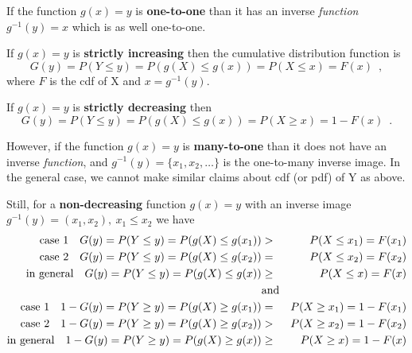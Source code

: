 If the function $g(x) = y$ is \textbf{one-to-one} than it has an inverse \emph{function} $g^{-1}(y) = x$ which is as well one-to-one.

If $g(x) = y$ is \textbf{strictly increasing} then the cumulative distribution function is
\begin{equation}
G(y) = P(Y \leq y) = P(g(X) \leq g(x)) = P(X \leq x) = F(x) \enspace ,
\end{equation}
where $F$ is the cdf of X and $x = g^{-1}(y)$.

If $g(x) = y$ is \textbf{strictly decreasing} then
\begin{equation}
G(y) = P(Y \leq y) = P(g(X) \leq g(x)) = P(X \geq x) = 1 - F(x) \enspace .
\end{equation}


However, if the function $g(x) = y$ is \textbf{many-to-one} than it does not have an inverse \emph{function}, and $g^{-1}(y) = \{ x_1, x_2, \ldots \}$ is the one-to-many inverse image. In the general case, we cannot make similar claims about cdf (or pdf) of Y as above.

Still, for a \textbf{non-decreasing} function $g(x) = y$ with an inverse image $g^{-1}(y) = (x_1, x_2), \ x_1 \leq x_2$ we have
\begin{eqnarray}
\text{case 1} \quad G(y) = P(Y \leq y) = P(g(X) \leq g(x_1)) & > & P(X \leq x_1) = F(x_1) \nonumber \\
\text{case 2} \quad G(y) = P(Y \leq y) = P(g(X) \leq g(x_2)) & = & P(X \leq x_2) = F(x_2) \nonumber \\
\text{in general} \quad G(y) = P(Y \leq y) = P(g(X) \leq g(x)) & \geq & P(X \leq x) = F(x) \nonumber \\
& \text{and} & \\
\text{case 1} \quad 1 - G(y) = P(Y \geq y) = P(g(X) \geq g(x_1)) & = & P(X \geq x_1) = 1 - F(x_1) \nonumber \\
\text{case 2} \quad 1 - G(y) = P(Y \geq y) = P(g(X) \geq g(x_2)) & > & P(X \geq x_2) = 1 - F(x_2) \nonumber \\
\text{in general} \quad 1 - G(y) = P(Y \geq y) = P(g(X) \geq g(x)) & \geq & P(X \geq x) = 1 - F(x) \nonumber
\end{eqnarray}

